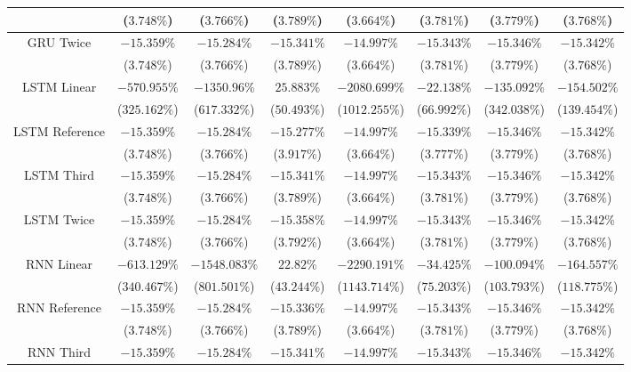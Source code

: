 \begin{table}[!ht]
{\begin{tabular}{|c|c|c|c|c|c|c|c|}
			 & ($3.748\%$) & ($3.766\%$) & ($3.789\%$) & ($3.664\%$) & ($3.781\%$) & ($3.779\%$) & ($3.768\%$) \\ \hline
			\multirow{2}{*}{GRU Twice} & $-15.359\%$ & $-15.284\%$ & $-15.341\%$ & $-14.997\%$ & $-15.343\%$ & $-15.346\%$ & $-15.342\%$ \\
			 & ($3.748\%$) & ($3.766\%$) & ($3.789\%$) & ($3.664\%$) & ($3.781\%$) & ($3.779\%$) & ($3.768\%$) \\ \hline
			\multirow{2}{*}{LSTM Linear} & $-570.955\%$ & $-1350.96\%$ & $25.883\%$ & $-2080.699\%$ & $-22.138\%$ & $-135.092\%$ & $-154.502\%$ \\
			 & ($325.162\%$) & ($617.332\%$) & ($50.493\%$) & ($1012.255\%$) & ($66.992\%$) & ($342.038\%$) & ($139.454\%$) \\ \hline
			\multirow{2}{*}{LSTM Reference} & $-15.359\%$ & $-15.284\%$ & $-15.277\%$ & $-14.997\%$ & $-15.339\%$ & $-15.346\%$ & $-15.342\%$ \\
			 & ($3.748\%$) & ($3.766\%$) & ($3.917\%$) & ($3.664\%$) & ($3.777\%$) & ($3.779\%$) & ($3.768\%$) \\ \hline
			\multirow{2}{*}{LSTM Third} & $-15.359\%$ & $-15.284\%$ & $-15.341\%$ & $-14.997\%$ & $-15.343\%$ & $-15.346\%$ & $-15.342\%$ \\
			 & ($3.748\%$) & ($3.766\%$) & ($3.789\%$) & ($3.664\%$) & ($3.781\%$) & ($3.779\%$) & ($3.768\%$) \\ \hline
			\multirow{2}{*}{LSTM Twice} & $-15.359\%$ & $-15.284\%$ & $-15.358\%$ & $-14.997\%$ & $-15.343\%$ & $-15.346\%$ & $-15.342\%$ \\
			 & ($3.748\%$) & ($3.766\%$) & ($3.792\%$) & ($3.664\%$) & ($3.781\%$) & ($3.779\%$) & ($3.768\%$) \\ \hline
			\multirow{2}{*}{RNN Linear} & $-613.129\%$ & $-1548.083\%$ & $22.82\%$ & $-2290.191\%$ & $-34.425\%$ & $-100.094\%$ & $-164.557\%$ \\
			 & ($340.467\%$) & ($801.501\%$) & ($43.244\%$) & ($1143.714\%$) & ($75.203\%$) & ($103.793\%$) & ($118.775\%$) \\ \hline
			\multirow{2}{*}{RNN Reference} & $-15.359\%$ & $-15.284\%$ & $-15.336\%$ & $-14.997\%$ & $-15.343\%$ & $-15.346\%$ & $-15.342\%$ \\
			 & ($3.748\%$) & ($3.766\%$) & ($3.789\%$) & ($3.664\%$) & ($3.781\%$) & ($3.779\%$) & ($3.768\%$) \\ \hline
			\multirow{2}{*}{RNN Third} & $-15.359\%$ & $-15.284\%$ & $-15.341\%$ & $-14.997\%$ & $-15.343\%$ & $-15.346\%$ & $-15.342\%$ \\

\end{tabular}}
\end{table}
